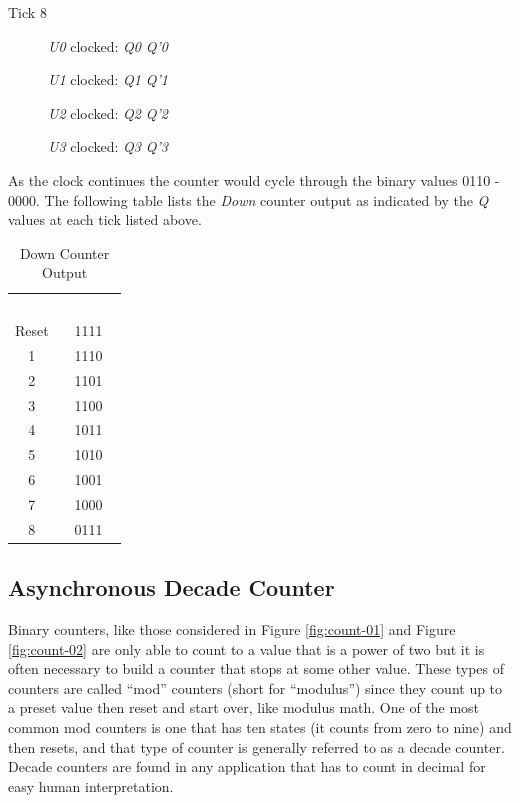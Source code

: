 \begin{description}
	\item [Tick 8] \textit{U0} clocked: \textit{Q0} \textuparrow \: \textemdash \: \textit{Q'0} \textdownarrow
	
	\hspace{14pt}\textit{U1} clocked: \textit{Q1} \textuparrow \: \textemdash \: \textit{Q'1} \textdownarrow
	
	\hspace{14pt}\textit{U2} clocked: \textit{Q2} \textuparrow \: \textemdash \: \textit{Q'2} \textdownarrow
	
	\hspace{14pt}\textit{U3} clocked: \textit{Q3} \textdownarrow \: \textemdash \: \textit{Q'3} \textuparrow
	
\end{description}

As the clock continues the counter would cycle through the binary values 0110 - 0000. The following table lists the \textit{Down} counter output as indicated by the \textit{Q} values at each tick listed above.

\begin{table}[H]
	\sffamily
	\newcommand{\head}[1]{\textcolor{white}{\textbf{#1}}}		
	\begin{center}
		\begin{tabular}{cc} 
			\rowcolor{black!75}
			\head{Tick} & \head{Output} \\
			Reset & 1111 \\
			1 & 1110 \\
			2 & 1101 \\
			3 & 1100 \\
			4 & 1011 \\
			5 & 1010 \\
			6 & 1001 \\
			7 & 1000 \\
			8 & 0111
		\end{tabular}
	\end{center}
	\caption{Down Counter Output}
	\label{tab0602}
\end{table}


\subsection{Asynchronous Decade Counter}

Binary counters, like those considered in Figure \ref{fig:count-01} and Figure \ref{fig:count-02} are only able to count to a value that is a power of two but it is often necessary to build a counter that stops at some other value. These types of counters are called ``mod'' counters (short for ``modulus'') since they count up to a preset value then reset and start over, like modulus math. One of the most common mod counters is one that has ten states (it counts from zero to nine) and then resets, and that type of counter is generally referred to as a decade counter. Decade counters are found in any application that has to count in decimal for easy human interpretation.

